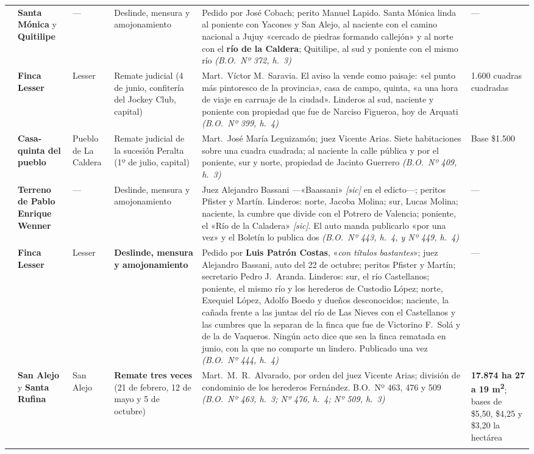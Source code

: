 {\begin{longtable}{@{}p{0.8cm}p{2.4cm}p{1.6cm}p{2.1cm}p{2.9cm}p{2.1cm}@{}}
\addlinespace
1912 & \textbf{Santa Mónica} y \textbf{Quitilipe} & --- & Deslinde, mensura y amojonamiento & Pedido por José Cobach; perito Manuel Lapido. Santa Mónica linda al poniente con Yacones y San Alejo, al naciente con el camino nacional a Jujuy «cercado de piedras formando callejón» y al norte con el \textbf{río de la Caldera}; Quitilipe, al sud y poniente con el mismo río \textit{(B.O.\ Nº 372, h.\ 3)}& --- \\
\addlinespace
1913 & \textbf{Finca Lesser} & Lesser & Remate judicial (4 de junio, confitería del Jockey Club, capital) & Mart.\ Víctor M.\ Saravia. El aviso la vende como paisaje: «el punto más pintoresco de la provincia», casa de campo, quinta, «a una hora de viaje en carruaje de la ciudad». Linderos al sud, naciente y poniente con propiedad que fue de Narciso Figueroa, hoy de Arquati \textit{(B.O.\ Nº 399, h.\ 4)}& 1.600 cuadras cuadradas \\
\addlinespace
1913 & \textbf{Casa-quinta del pueblo} & Pueblo de La Caldera & Remate judicial de la sucesión Peralta (1º de julio, capital) & Mart.\ José María Leguizamón; juez Vicente Arias. Siete habitaciones sobre una cuadra cuadrada; al naciente la calle pública y por el poniente, sur y norte, propiedad de Jacinto Guerrero\index{Guerrero, Jacinto} \textit{(B.O.\ Nº 409, h.\ 3)}& Base \$1.500 \\
\addlinespace
1913 & \textbf{Terreno de Pablo Enrique Wenner} & --- & Deslinde, mensura y amojonamiento & Juez Alejandro Bassani ---«Baassani» \textit{[sic]} en el edicto---; peritos Pfister y Martín. Linderos: norte, Jacoba Molina; sur, Lucas Molina; naciente, la cumbre que divide con el Potrero de Valencia; poniente, el «Río de la Caladera» \textit{[sic]}. El auto manda publicarlo «por una vez» y el Boletín lo publica dos \textit{(B.O.\ Nº 443, h.\ 4, y Nº 449, h.\ 4)}& --- \\
\addlinespace
1913 & \textbf{Finca Lesser} & Lesser & \textbf{Deslinde, mensura y amojonamiento} & Pedido por \textbf{Luis Patrón Costas}, «\textit{con títulos bastantes}»; juez Alejandro Bassani, auto del 22 de octubre; peritos Pfister y Martín; secretario Pedro J.\ Aranda. Linderos: sur, el río Castellanos; poniente, el mismo río y los herederos de Custodio López; norte, Exequiel López, Adolfo Boedo y dueños desconocidos; naciente, la cañada frente a las juntas del río de Las Nieves con el Castellanos y las cumbres que la separan de la finca que fue de Victorino F.\ Solá y de la de Vaqueros. Ningún acto dice que sea la finca rematada en junio, con la que no comparte un lindero. Publicado una vez \textit{(B.O.\ Nº 444, h.\ 4)}& --- \\
\addlinespace
1914 & \textbf{San Alejo} y \textbf{Santa Rufina} & San Alejo & \textbf{Remate tres veces} (21 de febrero, 12 de mayo y 5 de octubre) & Mart.\ M.\ R.\ Alvarado, por orden del juez Vicente Arias; división de condominio de los herederos Fernández\index{Fernández, Ángel}. B.O.\ Nº 463, 476 y 509 \textit{(B.O.\ Nº 463, h.\ 3; Nº 476, h.\ 4; Nº 509, h.\ 3)}& \textbf{17.874 ha 27 a 19 m\textsuperscript{2}}; bases de \$5,50, \$4,25 y \$3,20 la hectárea \\
\addlinespace


\end{longtable}}
